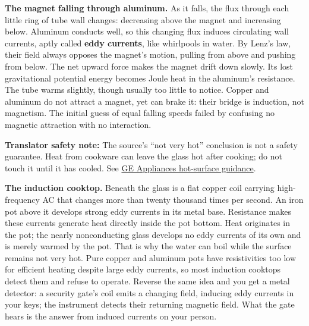\textbf{The magnet falling through aluminum.} As it falls, the flux through each little ring of tube wall changes: decreasing above the magnet and increasing below. Aluminum conducts well, so this changing flux induces circulating wall currents, aptly called \textbf{eddy currents}, like whirlpools in water. By Lenz's law, their field always opposes the magnet's motion, pulling from above and pushing from below. The net upward force makes the magnet drift down slowly. Its lost gravitational potential energy becomes Joule heat in the aluminum's resistance. The tube warms slightly, though usually too little to notice. Copper and aluminum do not attract a magnet, yet can brake it: their bridge is induction, not magnetism. The initial guess of equal falling speeds failed by confusing no magnetic attraction with no interaction.

\textbf{Translator safety note:} The source's ``not very hot'' conclusion is not a safety guarantee. Heat from cookware can leave the glass hot after cooking; do not touch it until it has cooled. See \href{https://products.geappliances.com/appliance/gea-support-search-content?contentId=000062465}{GE Appliances hot-surface guidance}.

\textbf{The induction cooktop.} Beneath the glass is a flat copper coil carrying high-frequency AC that changes more than twenty thousand times per second. An iron pot above it develops strong eddy currents in its metal base. Resistance makes these currents generate heat directly inside the pot bottom. Heat originates in the pot; the nearly nonconducting glass develops no eddy currents of its own and is merely warmed by the pot. That is why the water can boil while the surface remains not very hot. Pure copper and aluminum pots have resistivities too low for efficient heating despite large eddy currents, so most induction cooktops detect them and refuse to operate. Reverse the same idea and you get a metal detector: a security gate's coil emits a changing field, inducing eddy currents in your keys; the instrument detects their returning magnetic field. What the gate hears is the answer from induced currents on your person.

